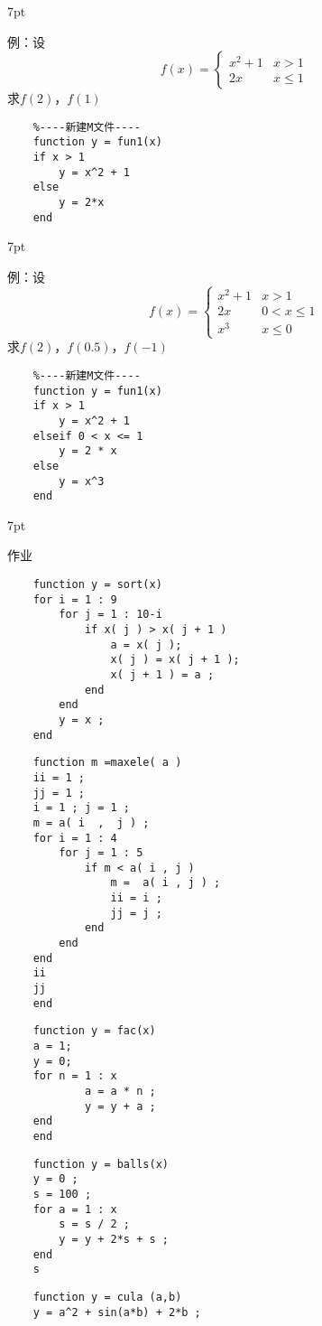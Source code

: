 \documentclass{article} %
\newenvironment{wa}{%
\def\FrameCommand{%
\hspace{1pt}%
{\color{LightCoral}\vrule width 2pt}%
{\color{washade}\vrule width 4pt}%
\colorbox{washade}%
}%
\MakeFramed{\advance\hsize-\width\FrameRestore}%
\noindent\hspace{-4.55pt}%
\begin{adjustwidth}{}{7pt}%
\vspace{2pt}\vspace{2pt}%
\normalfont %
}
{%
\vspace{2pt}\end{adjustwidth}\endMakeFramed%
}
\begin{document}
\begin{wa}
    例：设
    $$f(x) = 
    \begin{cases}
        x^{2} + 1 & x > 1\\
        2x & x \leqslant 1
    \end{cases}
    $$
    \indent 求$f(2)$，$f(1)$
\end{wa}
\begin{lstlisting}
    %----新建M文件----
    function y = fun1(x)
    if x > 1
        y = x^2 + 1
    else
        y = 2*x
    end
\end{lstlisting}

\begin{wa}
    例：设
    $$f(x) = 
    \begin{cases}
        x^{2} + 1 & x > 1\\
        2x & 0 < x \leqslant 1 \\
        x^{3} & x \leqslant 0
    \end{cases}
    $$
    \indent 求$f(2)$，$f(0.5)$，$f(-1)$
\end{wa}
\begin{lstlisting}
    %----新建M文件----
    function y = fun1(x)
    if x > 1
        y = x^2 + 1
    elseif 0 < x <= 1
        y = 2 * x
    else
        y = x^3
    end
\end{lstlisting}

\begin{wa}
    作业
\end{wa}
\begin{lstlisting}
    function y = sort(x)
    for i = 1 : 9
        for j = 1 : 10-i
            if x( j ) > x( j + 1 )
                a = x( j );
                x( j ) = x( j + 1 ); 
                x( j + 1 ) = a ;
            end
        end
        y = x ;
    end
\end{lstlisting}
\begin{lstlisting}
    function m =maxele( a ) 
    ii = 1 ;
    jj = 1 ;
    i = 1 ; j = 1 ; 
    m = a( i  ,  j ) ;
    for i = 1 : 4   
        for j = 1 : 5
            if m < a( i , j )
                m =  a( i , j ) ;
                ii = i ;
                jj = j ;
            end
        end
    end
    ii
    jj
    end
\end{lstlisting}
\begin{lstlisting}
    function y = fac(x)
    a = 1;
    y = 0;
    for n = 1 : x
            a = a * n ;
            y = y + a ;      
    end 
    end
\end{lstlisting}
\begin{lstlisting}
    function y = balls(x)
    y = 0 ;
    s = 100 ;
    for a = 1 : x
        s = s / 2 ;
        y = y + 2*s + s ;
    end
    s
\end{lstlisting}
\begin{lstlisting}
    function y = cula (a,b)
    y = a^2 + sin(a*b) + 2*b ;
\end{lstlisting}
\end{document}
